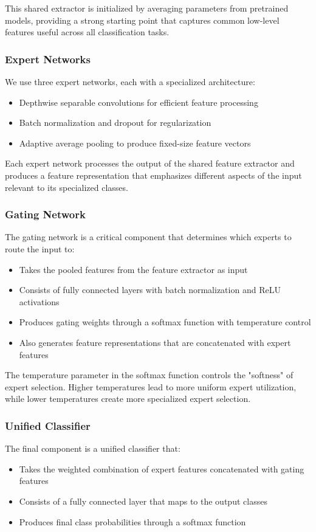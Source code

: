 \documentclass[conference]{IEEEtran}
\begin{document}
This shared extractor is initialized by averaging parameters from pretrained models, providing a strong starting point that captures common low-level features useful across all classification tasks.

\subsubsection{Expert Networks}
We use three expert networks, each with a specialized architecture:
\begin{itemize}
    \item Depthwise separable convolutions for efficient feature processing
    \item Batch normalization and dropout for regularization
    \item Adaptive average pooling to produce fixed-size feature vectors
\end{itemize}

Each expert network processes the output of the shared feature extractor and produces a feature representation that emphasizes different aspects of the input relevant to its specialized classes.

\subsubsection{Gating Network}
The gating network is a critical component that determines which experts to route the input to:
\begin{itemize}
    \item Takes the pooled features from the feature extractor as input
    \item Consists of fully connected layers with batch normalization and ReLU activations
    \item Produces gating weights through a softmax function with temperature control
    \item Also generates feature representations that are concatenated with expert features
\end{itemize}

The temperature parameter in the softmax function controls the "softness" of expert selection. Higher temperatures lead to more uniform expert utilization, while lower temperatures create more specialized expert selection.

\subsubsection{Unified Classifier}
The final component is a unified classifier that:
\begin{itemize}
    \item Takes the weighted combination of expert features concatenated with gating features
    \item Consists of a fully connected layer that maps to the output classes
    \item Produces final class probabilities through a softmax function
\end{itemize}
\end{document}
